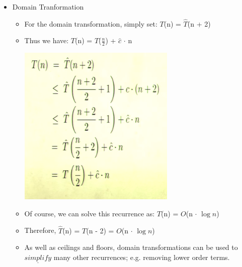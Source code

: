 \documentclass[12pt]{article}
\begin{document}
\begin{itemize}
\begin{itemize}
	\end{itemize}
\item Domain Tranformation
	\begin{itemize}
	\item For the domain transformation, simply set: \large{$T$(n) = $\hat{T}$(n + 2)}
	\item Thus we have: \large{$T$(n) = $T$(${\frac{n}{2}}$) + $\hat{c}$ $\cdot$ n}
		\begin{center}
		\includegraphics{lecture2l}
		\end{center}
	\item Of course, we can solve this recurrence as: \large{$T$(n) = $O$(n $\cdot$ $\log{}n$)}
	\item Therefore, \large{$\hat{T}$(n) = $T$(n - 2) = $O$(n $\cdot$ $\log{}n$)}
	\item As well as ceilings and floors, domain transformations can be used to 
	$\underline{simplify}$ many other recurrences; e.g. removing lower order terms.
	\end{itemize}
\end{itemize}
\end{document}
